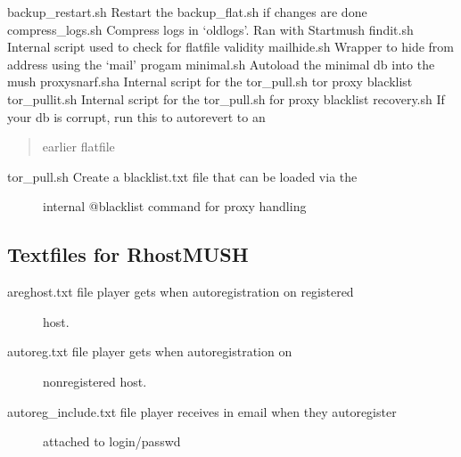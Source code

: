 \documentclass[letterpaper,10pt,english]{sphinxmanual}
\begin{document}
\sphinxAtStartPar
backup\_restart.sh       \textendash{} Restart the backup\_flat.sh if changes are done
compress\_logs.sh        \textendash{} Compress logs in ‘oldlogs’.  Ran with Startmush
findit.sh               \textendash{} Internal script used to check for flatfile validity
mailhide.sh             \textendash{} Wrapper to hide from address using the ‘mail’ progam
minimal.sh              \textendash{} Auto\sphinxhyphen{}load the minimal db into the mush
proxysnarf.sha          \textendash{} Internal script for the tor\_pull.sh tor proxy blacklist
tor\_pullit.sh           \textendash{} Internal script for the tor\_pull.sh for proxy blacklist
recovery.sh             \textendash{} If your db is corrupt, run this to auto\sphinxhyphen{}revert to an
\begin{quote}

\sphinxAtStartPar
earlier flatfile
\end{quote}
\begin{description}
\item[{tor\_pull.sh             \textendash{} Create a blacklist.txt file that can be loaded via the}] \leavevmode
\sphinxAtStartPar
internal @blacklist command for proxy handling

\end{description}


\subsection{Textfiles for RhostMUSH}
\label{\detokenize{maintenance:textfiles-for-rhostmush}}\begin{description}
\item[{areghost.txt           \sphinxhyphen{} file player gets when autoregistration on registered}] \leavevmode
\sphinxAtStartPar
host.

\item[{autoreg.txt            \sphinxhyphen{} file player gets when autoregistration on}] \leavevmode
\sphinxAtStartPar
non\sphinxhyphen{}registered host.

\item[{autoreg\_include.txt    \sphinxhyphen{} file player receives in email when they autoregister}] \leavevmode
\sphinxAtStartPar
attached to login/passwd

\end{description}
\end{document}
